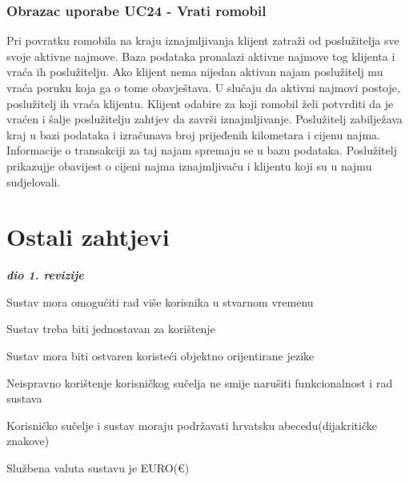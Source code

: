 				\subsubsection{Obrazac uporabe UC24 - Vrati romobil}
						Pri povratku romobila na kraju iznajmljivanja klijent zatraži od poslužitelja sve svoje aktivne najmove. Baza podataka pronalazi aktivne najmove tog klijenta i vraća ih poslužitelju. Ako klijent nema nijedan aktivan najam poslužitelj mu vraća poruku koja ga o tome obavještava. U slučaju da aktivni najmovi postoje, poslužitelj ih vraća klijentu. Klijent odabire za koji romobil želi potvrditi da je vraćen i šalje poslužitelju zahtjev da završi iznajmljivanje. Poslužitelj zabilježava kraj u bazi podataka i izračunava broj prijeđenih kilometara i cijenu najma. Informacije o transakciji za taj najam spremaju se u bazu podataka. Poslužitelj prikazujje obavijest o cijeni najma iznajmljivaču i klijentu koji su u najmu sudjelovali.
				\eject
	

		\section{Ostali zahtjevi}
		
			\textbf{\textit{dio 1. revizije}}\\
		 
			 \begin{packed_item}
			 	\item Sustav mora omogućiti rad više korisnika u stvarnom vremenu
			 	\item Sustav treba biti jednostavan za korištenje
			 	\item Sustav mora biti ostvaren koristeći objektno orijentirane jezike
			 	\item Neispravno korištenje korisničkog sučelja ne smije narušiti funkcionalnost i rad sustava
			 	\item Korisničko sučelje i sustav moraju podržavati hrvatsku abecedu(dijakritičke znakove)
			 	\item Službena valuta sustavu je EURO(€)
			 \end{packed_item}
			 
			 
			 
	